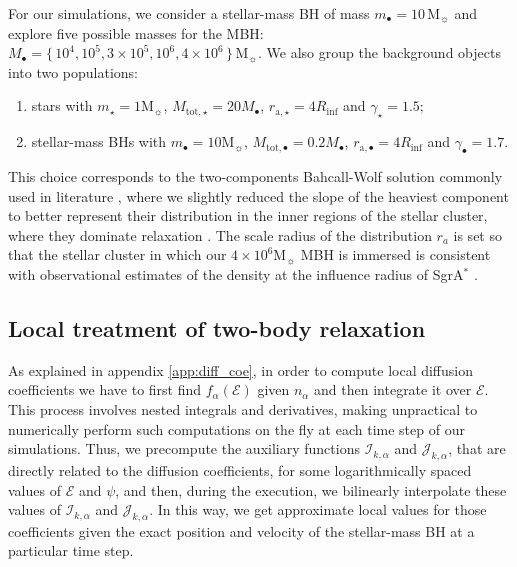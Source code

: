 \documentclass[desactivate]{aa}
\begin{document}
        For our simulations, we consider a stellar-mass BH of mass $m_\bullet = 10 \, \mathrm{M}_\sun$ and explore five possible masses for the MBH: $M_\bullet =  \{ \,10^4, 10^5, 3 \times 10^5, 10^6, 4 \times 10^6\,\} \,\mathrm{M}_\sun$. We also group the background objects into two populations:
        \begin{enumerate}
            \item stars with $m_\star = 1 \mathrm{M}_\sun$, $M_{\mathrm{tot},\star} = 20 M_\bullet$, $r_{\mathrm{a},\star} = 4 R_\mathrm{inf}$ and $\gamma_\star = 1.5$;
            \item stellar-mass BHs with $m_\bullet = 10 \mathrm{M}_\sun$, $M_{\mathrm{tot},\bullet} = 0.2 M_\bullet$, $r_{\mathrm{a},\bullet} = 4 R_\mathrm{inf}$ and $\gamma_\bullet = 1.7$.
        \end{enumerate}
        This choice corresponds to the two-components Bahcall-Wolf solution commonly used in literature \citep[][$\gamma \simeq 1.5$ for the lightest component, $\gamma \simeq 1.75$ for the heaviest component]{bahcallStarDistributionMassive1977}, where we slightly reduced the slope of the heaviest component to better represent their distribution in the inner regions of the stellar cluster, where they dominate relaxation \citep[see Fig.\ 4 of][for the quasi-relaxed distribution of the stellar-mass BHs]{2022MNRAS.514.3270B}. The scale radius of the distribution $r_a$ is set so that the stellar cluster in which our $4\times 10^6\mathrm{M}_\sun$ MBH is immersed is consistent with observational estimates of the density at the influence radius of SgrA$^*$ \citep[e.g.][]{2007A&A...469..125S}.
    
    \subsection{Local treatment of two-body relaxation} \label{sec:local}

        As explained in appendix \ref{app:diff_coe}, in order to compute local diffusion coefficients we have to first find $f_\alpha(\mathcal{E})$ given $n_\alpha$ and then integrate it over $\mathcal{E}$. This process involves nested integrals and derivatives, making unpractical to numerically perform such computations on the fly at each time step of our simulations.
        Thus, we precompute the auxiliary functions $\mathcal{I}_{k,\alpha}$ and $\mathcal{J}_{k,\alpha}$, that are directly related to the diffusion coefficients, for some logarithmically spaced values of $\mathcal{E}$ and $\psi$, and then, during the execution, we bilinearly interpolate these values of $\mathcal{I}_{k,\alpha}$ and $\mathcal{J}_{k,\alpha}$. In this way, we get approximate local values for those coefficients given the exact position and velocity of the stellar-mass BH at a particular time step.
\end{document}
